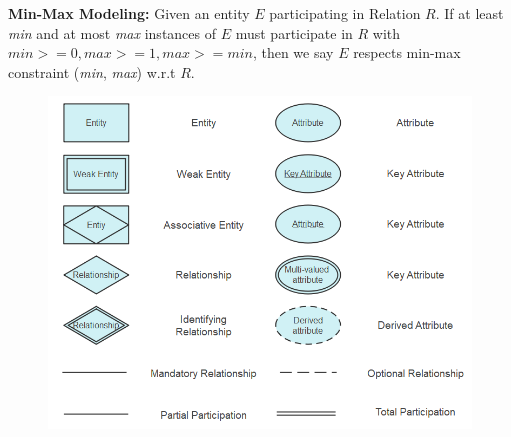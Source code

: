 \documentclass{article}
\begin{document}
\textbf{Min-Max Modeling: }Given an entity $E$ participating in Relation $R$. If at least \textit{min} and at most \textit{max} instances of $E$ must participate in $R$ with $\textit{min}>=0, \textit{max}>=1, \textit{max}>=\textit{min}$, then we say $E$ respects min-max constraint (\textit{min}, \textit{max}) w.r.t $R$.


\begin{figure}[H]
    \includegraphics[width=0.4\linewidth]{images/chens-notation-1.png}
\end{figure}
\end{document}

